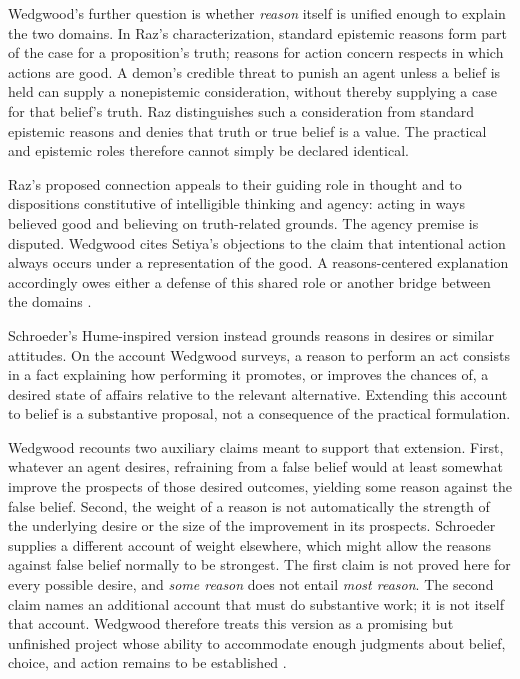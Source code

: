 Wedgwood's further question is whether \emph{reason} itself is unified
enough to explain the two domains. In Raz's characterization, standard
epistemic reasons form part of the case for a proposition's truth; reasons
for action concern respects in which actions are good. A demon's credible
threat to punish an agent unless a belief is held can supply a
nonepistemic consideration, without thereby supplying a case for that
belief's truth. Raz distinguishes such a consideration from standard
epistemic reasons and denies that truth or true belief is a value.
The practical and epistemic roles therefore cannot simply be declared
identical.

Raz's proposed connection appeals to their guiding role in thought and
to dispositions constitutive of intelligible thinking and agency:
acting in ways believed good and believing on truth-related grounds.
The agency premise is disputed. Wedgwood cites Setiya's objections to
the claim that intentional action always occurs under a representation
of the good. A reasons-centered explanation accordingly owes either a
defense of this shared role or another bridge between the domains
\parencite[p.~142 and p.~144, n.~8]{RalphWedgwood2021}.

Schroeder's Hume-inspired version instead grounds reasons in desires or
similar attitudes. On the account Wedgwood surveys, a reason to perform an
act consists in a fact explaining how performing it promotes, or improves
the chances of, a desired state of affairs relative to the relevant
alternative. Extending this account to belief is a substantive proposal,
not a consequence of the practical formulation.

Wedgwood recounts two auxiliary claims meant to support that extension.
First, whatever an agent desires, refraining from a false belief would
at least somewhat improve the prospects of those desired outcomes,
yielding some reason against the false belief. Second, the weight of
a reason is not automatically the strength of the underlying desire or
the size of the improvement in its prospects. Schroeder supplies a
different account of weight elsewhere, which might allow the reasons
against false belief normally to be strongest. The first claim is not
proved here for every possible desire, and \emph{some reason} does not
entail \emph{most reason}. The second claim names an additional account
that must do substantive work; it is not itself that account. Wedgwood
therefore treats this version as a promising but unfinished project whose
ability to accommodate enough judgments about belief, choice, and action
remains to be established
\parencite[pp.~142--143]{RalphWedgwood2021}.

